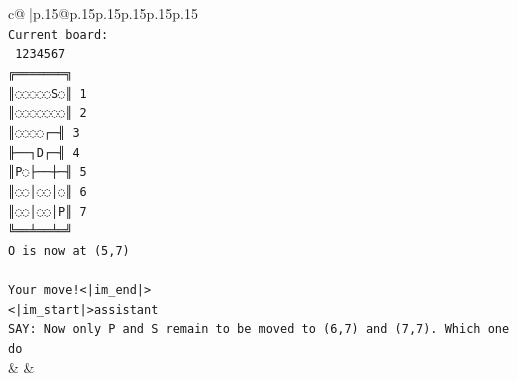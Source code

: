 \documentclass{article}
\begin{document}
{\begin{supertabular}{c@{$\;$}|p{.15\linewidth}@{}p{.15\linewidth}p{.15\linewidth}p{.15\linewidth}p{.15\linewidth}p{.15\linewidth}}
{{{\\ 
\texttt{Current board:} \\
\texttt{ 1234567} \\
\texttt{╔═══════╗} \\
\texttt{║◌◌◌◌◌S◌║ 1} \\
\texttt{║◌◌◌◌◌◌◌║ 2} \\
\texttt{║◌◌◌◌┌─╢ 3} \\
\texttt{╟──┐D┌─╢ 4} \\
\texttt{║P◌├──┼─╢ 5} \\
\texttt{║◌◌│◌◌│◌║ 6} \\
\texttt{║◌◌│◌◌│P║ 7} \\
\texttt{╚══╧══╧═╝} \\
\texttt{O is now at (5,7)} \\
\\ 
\texttt{Your move!<|im\_end|>} \\
\texttt{<|im\_start|>assistant} \\
\texttt{SAY: Now only P and S remain to be moved to (6,7) and (7,7). Which one do} \\
            }
        }
    }
    & & \\ \\


\end{supertabular}}
\end{document}
